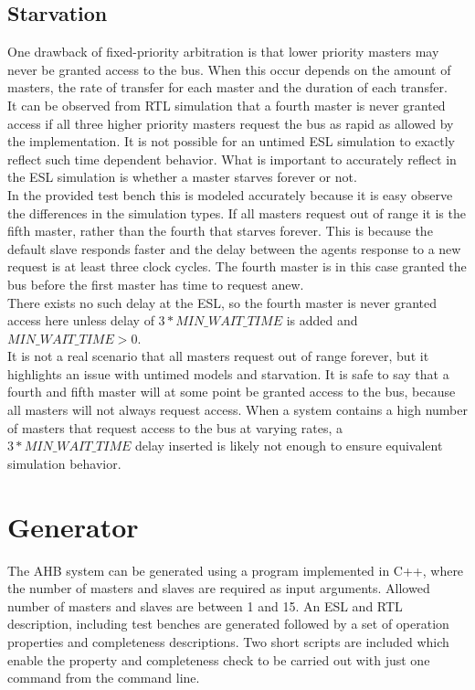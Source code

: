 \subsection{Starvation}
One drawback of fixed-priority arbitration is that lower priority masters may never be granted access to the bus. When this occur depends on the amount of masters, the rate of transfer for each master and the duration of each transfer. \\
It can be observed from RTL simulation that a fourth master is never granted access if all three higher priority masters request the bus as rapid as allowed by
the implementation. It is not possible for an untimed ESL simulation to exactly reflect such time dependent behavior. What is important to accurately reflect in the ESL simulation is whether a master starves forever or not. \\
In the provided test bench this is modeled accurately because it is easy observe the differences in the simulation types. If all masters request out of range it is the fifth master, rather than the fourth that starves forever. This is because the default slave responds faster and the delay between the agents response to a new request is at least three clock cycles. The fourth master is in this case granted the bus before the first master has time to request anew. \\
There exists no such delay at the ESL, so the fourth master is never granted access here unless delay of $3*MIN\_WAIT\_TIME$ is added and $MIN\_WAIT\_TIME>0$. \\
It is not a real scenario that all masters request out of range forever, but it highlights an issue with untimed models and starvation. It is safe to say that a fourth and fifth master will at some point be granted access to the bus, because all masters will not always request access. When a system contains a high number of masters that request access to the bus at varying rates, a $3*MIN\_WAIT\_TIME$ delay inserted is likely not enough to ensure equivalent simulation behavior. 

\section{Generator}
\label{sec:generator}
The AHB system can be generated using a program implemented in C++, where the number of masters and slaves are required as input arguments. Allowed number of
masters and slaves are between 1 and 15. An ESL and RTL description, including test benches are generated followed by a set of operation properties and completeness descriptions. Two short scripts are included which enable the property and completeness check to be carried out with just one command from the
command line. 

